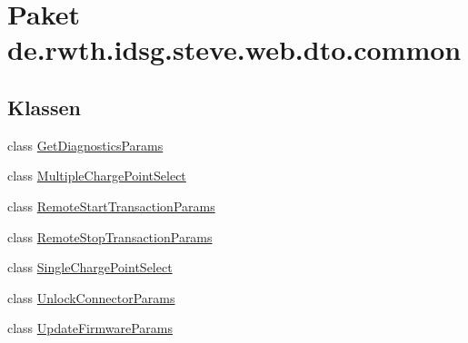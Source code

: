 \hypertarget{namespacede_1_1rwth_1_1idsg_1_1steve_1_1web_1_1dto_1_1common}{\section{Paket de.\+rwth.\+idsg.\+steve.\+web.\+dto.\+common}
\label{namespacede_1_1rwth_1_1idsg_1_1steve_1_1web_1_1dto_1_1common}
}
\subsection*{Klassen}
\begin{DoxyCompactItemize}
\item 
class \hyperlink{classde_1_1rwth_1_1idsg_1_1steve_1_1web_1_1dto_1_1common_1_1_get_diagnostics_params}{Get\+Diagnostics\+Params}
\item 
class \hyperlink{classde_1_1rwth_1_1idsg_1_1steve_1_1web_1_1dto_1_1common_1_1_multiple_charge_point_select}{Multiple\+Charge\+Point\+Select}
\item 
class \hyperlink{classde_1_1rwth_1_1idsg_1_1steve_1_1web_1_1dto_1_1common_1_1_remote_start_transaction_params}{Remote\+Start\+Transaction\+Params}
\item 
class \hyperlink{classde_1_1rwth_1_1idsg_1_1steve_1_1web_1_1dto_1_1common_1_1_remote_stop_transaction_params}{Remote\+Stop\+Transaction\+Params}
\item 
class \hyperlink{classde_1_1rwth_1_1idsg_1_1steve_1_1web_1_1dto_1_1common_1_1_single_charge_point_select}{Single\+Charge\+Point\+Select}
\item 
class \hyperlink{classde_1_1rwth_1_1idsg_1_1steve_1_1web_1_1dto_1_1common_1_1_unlock_connector_params}{Unlock\+Connector\+Params}
\item 
class \hyperlink{classde_1_1rwth_1_1idsg_1_1steve_1_1web_1_1dto_1_1common_1_1_update_firmware_params}{Update\+Firmware\+Params}
\end{DoxyCompactItemize}

